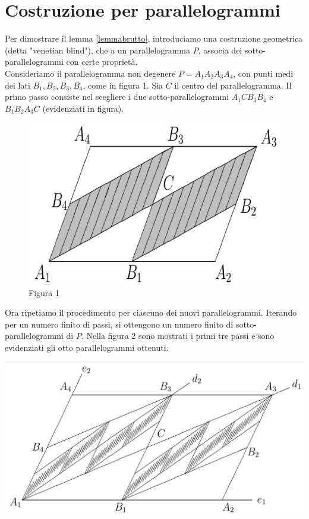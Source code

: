 \documentclass[a4paper, twoside,openright]{article}
\newcommand{\<}{\langle}
\renewcommand{\>}{\rangle}
\begin{document}
\newpage

\section{Costruzione per parallelogrammi}

Per dimostrare il lemma \ref{lemmabrutto}, introduciamo una costruzione geometrica (detta "venetian blind"), che a un parallelogramma $P$, associa dei sotto-parallelogrammi con certe proprietà.\\
Consideriamo il parallelogramma non degenere $P=A_{1} A_{2} A_{3} A_{4}$, con punti medi dei lati $B_{1}, B_{2}, B_{3}, B_{4}$, come in figura 1. Sia $C$ il centro del parallelogramma. Il primo passo consiste nel scegliere i due sotto-parallelogrammi $A_{1} C B_{3} B_{4}$ e $B_{1} B_{2} A_{3} C$ (evidenziati in figura).


	\begin{figure} [h!]
	\includegraphics[width=0.5\columnwidth]{passo1grigio.png}
	\centering
	\caption{Figura 1}
	\end{figure}


Ora ripetiamo il procedimento per ciascuno dei nuovi parallelogrammi. Iterando per un numero finito di passi, si ottengono un numero finito di sotto-parallelogrammi di $P$. Nella figura 2 sono mostrati i primi tre passi e sono evidenziati gli otto parallelogrammi ottenuti.\\

\begin{center}
	\includegraphics[width=0.7\columnwidth]{passi123.png}
\end{center}
\end{document}
